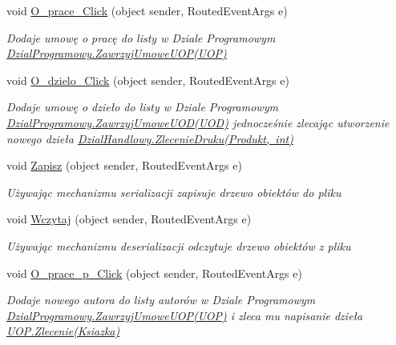 \begin{DoxyCompactItemize}
void \mbox{\hyperlink{class_projekt1_1_1_main_window_a9b7d68c94d1c814b017620cd33612a2a}{O\+\_\+prace\+\_\+\+Click}} (object sender, Routed\+Event\+Args e)
\begin{DoxyCompactList}\small\item\em Dodaje umowę o pracę do listy w Dziale Programowym \mbox{\hyperlink{class_projekt1_1_1_dzial_programowy_a7814d93c057013c72d4b5f7153ed3530}{Dzial\+Programowy.\+Zawrzyj\+Umowe\+U\+O\+P(\+U\+O\+P)}} \end{DoxyCompactList}\item 
void \mbox{\hyperlink{class_projekt1_1_1_main_window_aec1e425ac5a4ad9c3e751fdb343e9091}{O\+\_\+dzielo\+\_\+\+Click}} (object sender, Routed\+Event\+Args e)
\begin{DoxyCompactList}\small\item\em Dodaje umowę o dzieło do listy w Dziale Programowym \mbox{\hyperlink{class_projekt1_1_1_dzial_programowy_ae4c62d15b8d0083f6501c44f5255abb6}{Dzial\+Programowy.\+Zawrzyj\+Umowe\+U\+O\+D(\+U\+O\+D)}} jednocześnie zlecając utworzenie nowego dzieła \mbox{\hyperlink{class_projekt1_1_1_dzial_handlowy_a42c78f53cf41e75b39498a7da96e7bc3}{Dzial\+Handlowy.\+Zlecenie\+Druku(\+Produkt, int)}} \end{DoxyCompactList}\item 
void \mbox{\hyperlink{class_projekt1_1_1_main_window_ae4f4e8c3ba5f2c9278e04ab5317d0c70}{Zapisz}} (object sender, Routed\+Event\+Args e)
\begin{DoxyCompactList}\small\item\em Używając mechanizmu serializacji zapisuje drzewo obiektów do pliku \end{DoxyCompactList}\item 
void \mbox{\hyperlink{class_projekt1_1_1_main_window_a51737ca038f759048d8fbba52e3e1a22}{Wczytaj}} (object sender, Routed\+Event\+Args e)
\begin{DoxyCompactList}\small\item\em Używając mechanizmu deserializacji odczytuje drzewo obiektów z pliku \end{DoxyCompactList}\item 
void \mbox{\hyperlink{class_projekt1_1_1_main_window_a8da41bd3feb26166db071d7e500a9cc4}{O\+\_\+prace\+\_\+p\+\_\+\+Click}} (object sender, Routed\+Event\+Args e)
\begin{DoxyCompactList}\small\item\em Dodaje nowego autora do listy autorów w Dziale Programowym \mbox{\hyperlink{class_projekt1_1_1_dzial_programowy_a7814d93c057013c72d4b5f7153ed3530}{Dzial\+Programowy.\+Zawrzyj\+Umowe\+U\+O\+P(\+U\+O\+P)}} i zleca mu napisanie dzieła \mbox{\hyperlink{class_projekt1_1_1_u_o_p_aa2f46bfc4700f601a35eaa4d99b21727}{U\+O\+P.\+Zlecenie(\+Ksiazka)}} \end{DoxyCompactList}\item 

\end{DoxyCompactItemize}
